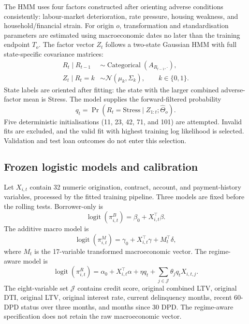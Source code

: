 \documentclass[12pt]{article}
\begin{document}
The HMM uses four factors constructed after orienting adverse conditions consistently: labour-market deterioration, rate pressure, housing weakness, and household/financial strain. For origin $o$, transformation and standardisation parameters are estimated using macroeconomic dates no later than the training endpoint $T_o$. The factor vector $Z_t$ follows a two-state Gaussian HMM with full state-specific covariance matrices:
\begin{align}
R_t\mid R_{t-1} &\sim \operatorname{Categorical}(A_{R_{t-1},\cdot}),\\
Z_t\mid R_t=k &\sim \mathcal{N}(\mu_k,\Sigma_k),\qquad k\in\{0,1\}.
\end{align}
State labels are oriented after fitting: the state with the larger combined adverse-factor mean is Stress. The model supplies the forward-filtered probability
\begin{equation}
q_t=\Pr(R_t=\text{Stress}\mid Z_{1:t};\widehat\Theta_o).
\end{equation}
Five deterministic initialisations (11, 23, 42, 71, and 101) are attempted. Invalid fits are excluded, and the valid fit with highest training log likelihood is selected. Validation and test loan outcomes do not enter this selection.

\subsection{Frozen logistic models and calibration}

Let $X_{i,t}$ contain 32 numeric origination, contract, account, and payment-history variables, processed by the fitted training pipeline. Three models are fixed before the rolling tests. Borrower-only is
\begin{equation}
\operatorname{logit}(\pi^B_{i,t})=\beta_0+X_{i,t}^{\top}\beta.
\end{equation}
The additive macro model is
\begin{equation}
\operatorname{logit}(\pi^M_{i,t})=\gamma_0+X_{i,t}^{\top}\gamma+M_t^{\top}\delta,
\end{equation}
where $M_t$ is the 17-variable transformed macroeconomic vector. The regime-aware model is
\begin{equation}
\operatorname{logit}(\pi^R_{i,t})=\alpha_0+X_{i,t}^{\top}\alpha+\eta q_t+
\sum_{j\in\mathcal{J}}\theta_j q_tX_{i,t,j}.
\end{equation}
The eight-variable set $\mathcal{J}$ contains credit score, original combined LTV, original DTI, original LTV, original interest rate, current delinquency months, recent 60-DPD status over three months, and months since 30 DPD. The regime-aware specification does not retain the raw macroeconomic vector.
\end{document}
